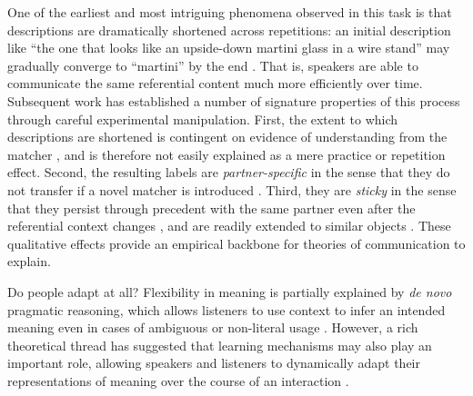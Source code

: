 \documentclass[11pt]{article}
\begin{document}
One of the earliest and most intriguing phenomena observed in this task is that descriptions are dramatically shortened across repetitions: an initial description like ``the one that looks like an upside-down martini glass in a wire stand'' may gradually converge to ``martini'' by the end  \cite{KraussWeinheimer64_ReferencePhrases}.
That is, speakers are able to communicate the same referential content much more efficiently over time.
Subsequent work has established a number of signature properties of this process through careful experimental manipulation.
First, the extent to which descriptions are shortened is contingent on evidence of understanding from the matcher \cite{KraussWeinheimer66_Tangrams,KraussEtAl77_AudioVisualBackChannel,HupetChantraine92_CollaborationOrRepitition}, and is therefore not easily explained as a mere practice or repetition effect.
Second, the resulting labels are \emph{partner-specific} in the sense that they do not transfer if a novel matcher is introduced \cite{WilkesGibbsClark92_CoordinatingBeliefs,MetzingBrennan03_PartnerSpecificPacts,brennan_partner-specific_2009}.
Third, they are \emph{sticky} in the sense that they persist through precedent with the same partner even after the referential context changes \cite{BrennanClark96_ConceptualPactsConversation}, and are readily extended to similar objects \cite{MarkmanMakin98_ReferentialCommunicationCategory}.
These qualitative effects provide an empirical backbone for theories of communication to explain. %

Do people adapt at all? 
Flexibility in meaning is partially explained by \emph{de novo} pragmatic reasoning, which allows listeners to use context to infer an intended meaning even in cases of ambiguous or non-literal usage \cite{Clark83_NonceSense,LascaridesCopestake98_PragmaticsWordMeaning,Glucksberg01_FigurativeLanguage,GoodmanFrank16_RSATiCS}.
However, a rich theoretical thread has suggested that learning mechanisms may also play an important role, allowing speakers and listeners to dynamically adapt their representations of meaning over the course of an interaction \cite{BrennanClark96_ConceptualPactsConversation,pickering2004toward,delaney2019neural}.
\end{document}
